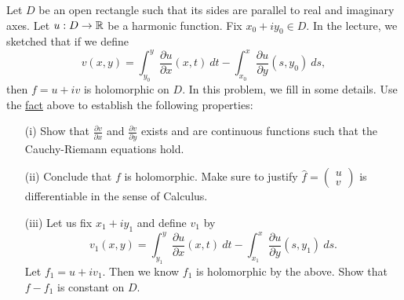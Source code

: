 \documentclass[a4paper]{article}
\begin{document}
\begin{problem}
    Let \( D  \) be an open rectangle such that its sides are parallel to real and imaginary axes. Let \( u: D \to \mathbb{R}  \) be a harmonic function. Fix \( {x}_{0} + i {y}_{0} \in D  \). In the lecture, we sketched that if we define
    \[  v(x,y) = \int_{ {y}_{0} }^{ y }  \frac{\partial u }{\partial x } (x,t) \ dt - \int_{ {x}_{0} }^{ x }  \frac{\partial u }{\partial y }(s, {y}_{0})  \ ds, \]
    then \( f = u + iv \) is holomorphic on \( D  \). In this problem, we fill in some details.
    Use the {\hyperref[Fact]{fact}} above to establish the following properties:
    \begin{enumerate}
        \item[(i)] Show that \( \displaystyle \frac{\partial v }{\partial x }   \) and \( \displaystyle \frac{\partial v }{\partial y }  \) exists and are continuous functions such that the Cauchy-Riemann equations hold.
        \item[(ii)] Conclude that \( f  \) is holomorphic. Make sure to justify \( \hat{f} = \begin{pmatrix} u \\ v \end{pmatrix}   \) is differentiable in the sense of Calculus.
        \item[(iii)] Let us fix \( {x}_{1} + i {y}_{1} \) and define \( {v}_{1} \) by 
            \[  {v}_{1}(x,y) = \int_{ {y}_{1} }^{ y }  \frac{\partial u }{\partial x } (x,t) \ dt - \int_{ {x}_{1} }^{ x } \frac{\partial u }{\partial y } (s, {y}_{1}) \ ds. \]
            Let \( {f}_{1} = u + i {v}_{1} \). Then we know \( {f}_{1}  \) is holomorphic by the above. Show that \( f - {f}_{1}  \) is constant on \( D  \).
    \end{enumerate}
\end{problem}
\end{document}
